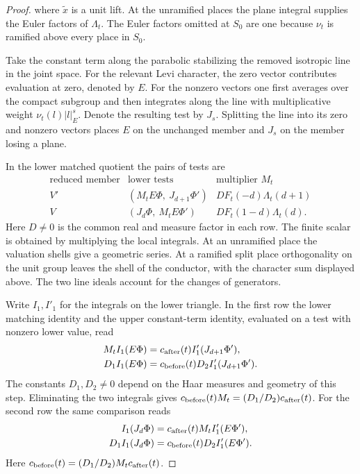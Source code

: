 \begin{proof}
where \(\tilde x\) is a unit lift. At the unramified places the
plane integral supplies the Euler factors of \(\Lambda_t\).
The Euler factors omitted at \(S_0\) are one because \(\nu_t\)
is ramified above every place in \(S_0\).

Take the constant term along the parabolic stabilizing the removed
isotropic line in the joint space. For the relevant Levi character,
the zero vector contributes evaluation at zero, denoted by \(E\). For the nonzero vectors one first averages
over the compact subgroup and then integrates along the line with
multiplicative weight \(\nu_t(l)|l|_E^s\). Denote the resulting test
by \(J_s\). Splitting the line into its zero and nonzero vectors
places \(E\) on the unchanged member and \(J_s\) on the member
losing a plane.

In the lower matched quotient the pairs of tests are
\[
 \begin{array}{c|c|c}
 \text{reduced member}&\text{lower tests}&
                    \text{multiplier }M_t\\ \hline
 V' & (M_t E\Phi,\ J_{d+1}\Phi') & D F_t(-d)\Lambda_t(d+1)\\
 V  & (J_d\Phi,\ M_t E\Phi') & D F_t(1-d)\Lambda_t(d).
 \end{array}
\]
Here \(D\ne0\) is the common real and measure factor in each row.
The finite scalar is obtained by multiplying the local integrals.
At an unramified place the valuation shells give a geometric series.
At a ramified split place orthogonality on the unit group leaves the
shell of the conductor, with the character sum displayed above. The
two line ideals account for the changes of generators.

Write \(I_1,I'_1\) for the integrals on the lower triangle. In the
first row the lower matching identity and the upper constant-term
identity, evaluated on a test with nonzero lower value, read
\[
 \begin{aligned}
 M_t I_1(E\Phi)&=c_{\rm after}(t) I'_1(J_{d+1}\Phi'),\\
 D_1 I_1(E\Phi)&=c_{\rm before}(t)D_2 I'_1(J_{d+1}\Phi').
 \end{aligned}
\]
The constants \(D_1,D_2\ne0\) depend on the Haar measures and geometry
of this step. Eliminating the two integrals gives
\(c_{\rm before}(t)M_t=(D_1/D_2)c_{\rm after}(t)\).
For the second row the same comparison reads
\[
 \begin{aligned}
 I_1(J_d\Phi)&=c_{\rm after}(t) M_t I'_1(E\Phi'),\\
 D_1 I_1(J_d\Phi)&=c_{\rm before}(t) D_2 I'_1(E\Phi').
 \end{aligned}
\]
Here \(c_{\rm before}(t)=(D_1/D_2)M_t c_{\rm after}(t)\).


\end{proof}
